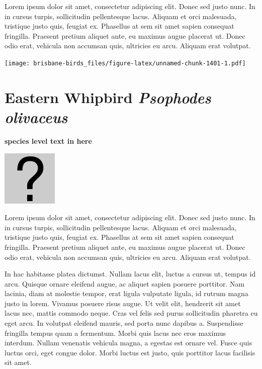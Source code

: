 \documentclass[]{book}
\let\origfigure\figure
\let\endorigfigure\endfigure
\renewenvironment{figure}[1][2] {
  \expandafter\origfigure\expandafter[H]
} {
  \endorigfigure
}
\begin{document}
Lorem ipsum dolor sit amet, consectetur adipiscing elit. Donec sed justo
nunc. In in cursus turpis, sollicitudin pellentesque lacus. Aliquam et
orci malesuada, tristique justo quis, feugiat ex. Phasellus at sem sit
amet sapien consequat fringilla. Praesent pretium aliquet ante, eu
maximus augue placerat ut. Donec odio erat, vehicula non accumsan quis,
ultricies eu arcu. Aliquam erat volutpat.

\texttt{[image: brisbane-birds\_files/figure-latex/unnamed-chunk-1401-1.pdf]}

\section{\texorpdfstring{Eastern Whipbird \emph{Psophodes
olivaceus}}{Eastern Whipbird Psophodes olivaceus}}\label{eastern-whipbird-psophodes-olivaceus}

\textbf{species level text in here}

\begin{figure}
\centering
\includegraphics{assets/missing.png}
\caption{No image for species}
\end{figure}

Lorem ipsum dolor sit amet, consectetur adipiscing elit. Donec sed justo
nunc. In in cursus turpis, sollicitudin pellentesque lacus. Aliquam et
orci malesuada, tristique justo quis, feugiat ex. Phasellus at sem sit
amet sapien consequat fringilla. Praesent pretium aliquet ante, eu
maximus augue placerat ut. Donec odio erat, vehicula non accumsan quis,
ultricies eu arcu. Aliquam erat volutpat.

In hac habitasse platea dictumst. Nullam lacus elit, luctus a cursus ut,
tempus id arcu. Quisque ornare eleifend augue, ac aliquet sapien posuere
porttitor. Nam lacinia, diam at molestie tempor, erat ligula vulputate
ligula, id rutrum magna justo in lorem. Vivamus posuere risus augue. Ut
velit elit, hendrerit sit amet lacus nec, mattis commodo neque. Cras vel
felis sed purus sollicitudin pharetra eu eget arcu. In volutpat eleifend
mauris, sed porta nunc dapibus a. Suspendisse fringilla tempus quam a
fermentum. Morbi quis lacus nec eros maximus interdum. Nullam venenatis
vehicula magna, a egestas est ornare vel. Fusce quis luctus orci, eget
congue dolor. Morbi luctus est justo, quis porttitor lacus facilisis sit
amet.
\end{document}
